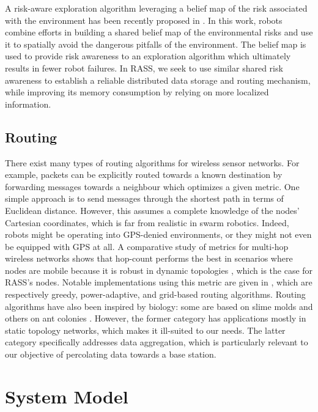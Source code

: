 A risk-aware exploration algorithm leveraging a belief map of the risk
associated with the environment has been recently proposed in
\cite{vielfaure2021dora}. In this work, robots combine efforts in building a shared belief map of the environmental risks and use it to spatially avoid the dangerous
pitfalls of the environment. The belief map is used to provide risk
awareness to an exploration algorithm which ultimately results in
fewer robot failures. In \ac{RASS}, we seek to use similar shared risk awareness to establish a reliable distributed data storage and
routing mechanism, while improving its memory consumption by relying on more localized information.

\subsection{Routing}

There exist many types of routing algorithms for wireless sensor
networks. For example, packets can be explicitly routed towards a known destination
by forwarding messages towards a neighbour which optimizes a given
metric. One simple approach is to send messages through the
shortest path in terms of Euclidean distance. However, this assumes a
complete knowledge of the nodes' Cartesian coordinates, which is far
from realistic in swarm robotics. Indeed, robots might be operating
into GPS-denied environments, or they might not even be equipped with
GPS at all. A comparative study of metrics for multi-hop wireless networks shows
that hop-count performs the best in scenarios where nodes are mobile
\cite{draves2004comparison} because it is robust in dynamic topologies
\cite{watteyne2009implementation}, which is the case for \ac{RASS}'s
nodes. Notable implementations using this metric are given in
\cite{kuruvila2005hop,zhang2014efficient,al2019efficient}, which are
respectively greedy, power-adaptive, and grid-based routing algorithms.
Routing algorithms have also been inspired by biology: some are based
on slime molds \cite{li2011slime,jiang2018toward} and others on ant
colonies \cite{jiang2018effective,liao2008data}. However, the
former category has applications mostly in static topology networks,
which makes it ill-suited to our needs. The latter category
specifically addresses data aggregation, which is particularly
relevant to our objective of percolating data towards a base station.


\section{System Model}
\label{systemmodel}

